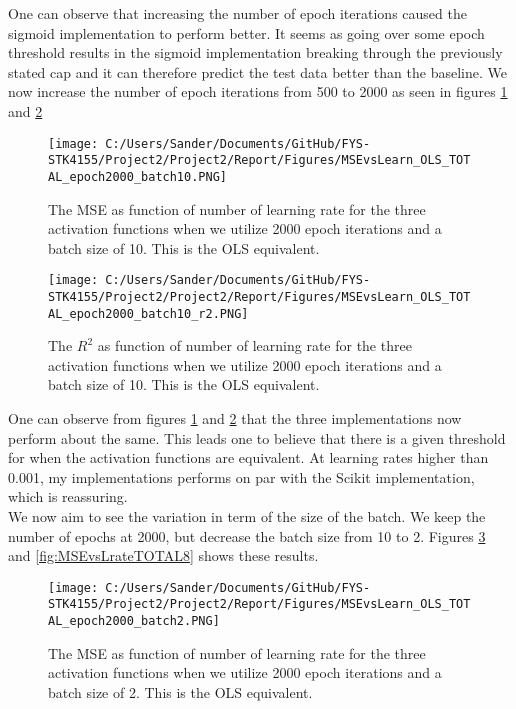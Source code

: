 \documentclass[12pt,a4paper]{article}
\begin{document}
\noindent One can observe that increasing the number of epoch iterations caused the sigmoid implementation to perform better. It seems as going over some epoch threshold results in the sigmoid implementation breaking through the previously stated cap and it can therefore predict the test data better than the baseline. We now increase the number of epoch iterations from 500 to 2000 as seen in figures \ref{fig:MSEvsLrateTOTAL5} and \ref{fig:MSEvsLrateTOTAL6}

\begin{figure}[H]
\centering
\texttt{[image: C:/Users/Sander/Documents/GitHub/FYS-STK4155/Project2/Project2/Report/Figures/MSEvsLearn\_OLS\_TOTAL\_epoch2000\_batch10.PNG]}
\caption{\label{fig:MSEvsLrateTOTAL5} The MSE as function of number of learning rate for the three activation functions when we utilize 2000 epoch iterations and a batch size of 10. This is the OLS equivalent.}
\end{figure}

\begin{figure}[H]
\centering
\texttt{[image: C:/Users/Sander/Documents/GitHub/FYS-STK4155/Project2/Project2/Report/Figures/MSEvsLearn\_OLS\_TOTAL\_epoch2000\_batch10\_r2.PNG]}
\caption{\label{fig:MSEvsLrateTOTAL6} The $R^2$ as function of number of learning rate for the three activation functions when we utilize 2000 epoch iterations and a batch size of 10. This is the OLS equivalent.}
\end{figure}

\noindent One can observe from figures \ref{fig:MSEvsLrateTOTAL5} and \ref{fig:MSEvsLrateTOTAL6} that the three implementations now perform about the same. This leads one to believe that there is a given threshold for when the activation functions are equivalent. At learning rates higher than 0.001, my implementations performs on par with the Scikit implementation, which is reassuring. 
\\
We now aim to see the variation in term of the size of the batch. We keep the number of epochs at 2000, but decrease the batch size from 10 to 2. Figures \ref{fig:MSEvsLrateTOTAL7} and \ref{fig:MSEvsLrateTOTAL8} shows these results.

\begin{figure}[H]
\centering
\texttt{[image: C:/Users/Sander/Documents/GitHub/FYS-STK4155/Project2/Project2/Report/Figures/MSEvsLearn\_OLS\_TOTAL\_epoch2000\_batch2.PNG]}
\caption{\label{fig:MSEvsLrateTOTAL7} The MSE as function of number of learning rate for the three activation functions when we utilize 2000 epoch iterations and a batch size of 2. This is the OLS equivalent.}
\end{figure}
\end{document}
